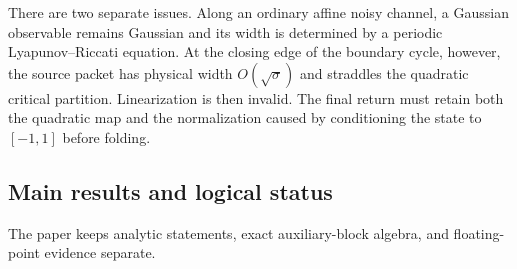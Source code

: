 \documentclass[11pt]{article}
\theoremstyle{definition}
\theoremstyle{remark}
\begin{document}
There are two separate issues.  Along an ordinary affine noisy channel, a
Gaussian observable remains Gaussian and its width is determined by a
periodic Lyapunov--Riccati equation.  At the closing edge of the boundary
cycle, however, the source packet has physical width $O(\sqrt\sigma)$ and
straddles the quadratic critical partition.  Linearization is then invalid.
The final return must retain both the quadratic map and the normalization
caused by conditioning the state to $[-1,1]$ before folding.

\subsection*{Main results and logical status}

The paper keeps analytic statements, exact auxiliary-block algebra, and
floating-point evidence separate.
\end{document}
